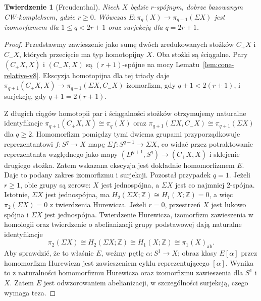 \documentclass[11pt,a4paper,oneside]{report}
\newcommand{\Z}{\mathbb{Z}}
\theoremstyle{plain}
\newtheorem{twierdzenie}{Twierdzenie}[section]
\theoremstyle{definition}
\theoremstyle{remark}
\begin{document}
\begin{twierdzenie}[Freudenthal]
\label{thm:freudenthal-v8}
Niech $X$ będzie $r$-spójnym, dobrze bazowanym
CW-kompleksem, gdzie $r\ge0$. Wówczas
$E:\pi_q(X)\to\pi_{q+1}(\Sigma X)$
jest izomorfizmem dla $1\le q<2r+1$ oraz
surjekcją dla $q=2r+1$.
\end{twierdzenie}
\begin{proof}
Przedstawmy zawieszenie jako sumę dwóch
zredukowanych stożków $C_+X$ i $C_-X$,
których przecięcie ma typ homotopijny $X$.
Oba stożki są ściągalne. Pary $(C_+X,X)$
i $(C_-X,X)$ są $(r+1)$-spójne na mocy
Lematu~\ref{lem:cone-relative-v8}.
Ekscyzja homotopijna dla tej triady daje
$\pi_{q+1}(C_+X,X)\to
\pi_{q+1}(\Sigma X,C_-X)$
izomorfizm, gdy $q+1<2(r+1)$, i surjekcję,
gdy $q+1=2(r+1)$.

Z długich ciągów homotopii par i ściągalności
stożków otrzymujemy naturalne identyfikacje
$\pi_{q+1}(C_+X,X)\cong\pi_q(X)$ oraz
$\pi_{q+1}(\Sigma X,C_-X)\cong
\pi_{q+1}(\Sigma X)$ dla $q\ge2$.
Homomorfizm pomiędzy tymi dwiema grupami
przyporządkowuje reprezentantowi $f:S^q\to X$
mapę $\Sigma f:S^{q+1}\to\Sigma X$,
co widać przez potraktowanie reprezentanta względnego
jako mapy $(D^{q+1},S^q)\to(C_+X,X)$
i sklejenie drugiego stożka.
Zatem wskazana ekscyzja jest dokładnie homomorfizmem $E$.
Daje to podany zakres izomorfizmu i surjekcji.
Pozostał przypadek $q=1$. Jeżeli $r\ge1$, obie
grupy są zerowe: $X$ jest jednospójna, a $\Sigma X$
jest co najmniej $2$-spójna. Istotnie, $\Sigma X$ jest
jednospójna, ma $H_2(\Sigma X;\Z)\cong H_1(X;\Z)=0$,
a więc $\pi_2(\Sigma X)=0$ z twierdzenia Hurewicza. Jeżeli $r=0$, przestrzeń $X$
jest łukowo spójna i $\Sigma X$ jest jednospójna.
Twierdzenie Hurewicza, izomorfizm zawieszenia w homologii
oraz twierdzenie o abelianizacji grupy podstawowej dają
naturalne identyfikacje
\[
\pi_2(\Sigma X)\cong H_2(\Sigma X;\Z)
\cong H_1(X;\Z)\cong\pi_1(X)_{\mathrm{ab}}.
\]
Aby sprawdzić, że to właśnie $E$, weźmy pętlę
$\alpha:S^1\to X$; obraz klasy $E[\alpha]$ przez
homomorfizm Hurewicza jest zawieszeniem cyklu
reprezentującego $[\alpha]$. Wynika to z naturalności
homomorfizmu Hurewicza oraz izomorfizmu zawieszenia dla
$S^1$ i $X$. Zatem $E$ jest odwzorowaniem abelianizacji,
w szczególności surjekcją, czego wymaga teza.
\end{proof}

\begin{center}
\end{center}
\end{document}
